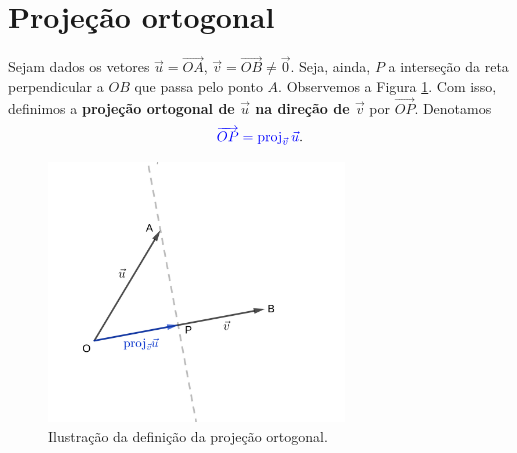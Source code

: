 \section{Projeção ortogonal}\label{cap_prodesc_sec_proj}
\badgeRevisar

Sejam dados os vetores $\vec{u}=\overrightarrow{OA}$, $\vec{v}=\overrightarrow{OB}\neq\vec{0}$. Seja, ainda, $P$ a interseção da reta perpendicular a $OB$ que passa pelo ponto $A$. Observemos a Figura \ref{fig:proj}. Com isso, definimos a {\bf projeção ortogonal de $\vec{u}$ na direção de $\vec{v}$}  por $\overrightarrow{OP}$. Denotamos
\begin{equation}
  {\color{blue}\overrightarrow{OP} = \operatorname{proj}_{\vec{v}}\vec{u}}.
\end{equation}

\begin{figure}[H]
  \centering
  \includegraphics[width=0.7\textwidth]{./cap_prodesc/dados/fig_proj/fig_proj}
  \caption{Ilustração da definição da projeção ortogonal.}
  \label{fig:proj}
\end{figure}

